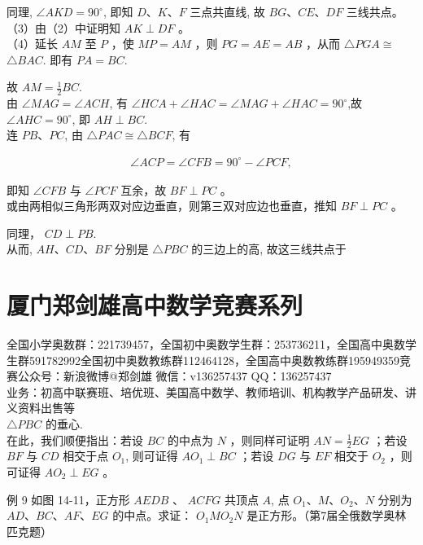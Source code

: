 \documentclass[10pt]{article}
\begin{document}
同理, $\angle A K D=90^{\circ}$, 即知 $D 、 K 、 F$ 三点共直线, 故 $B G 、 C E 、 D F$ 三线共点。\\
（3）由（2）中证明知 $A K \perp D F$ 。\\
（4）延长 $A M$ 至 $P$ ，使 $M P=A M$ ，则 $P G=A E=A B$ ，从而 $\triangle P G A \cong$ $\triangle B A C$. 即有 $P A=B C$.

故 $A M=\frac{1}{2} B C$.\\
由 $\angle M A G=\angle A C H$, 有 $\angle H C A+\angle H A C=\angle M A G+\angle H A C=90^{\circ}$,故 $\angle A H C=90^{\circ}$, 即 $A H \perp B C$.\\
连 $P B 、 P C$, 由 $\triangle P A C \cong \triangle B C F$, 有

\begin{align*}
\angle A C P=\angle C F B=90^{\circ}-\angle P C F,
\end{align*}

即知 $\angle C F B$ 与 $\angle P C F$ 互余，故 $B F \perp P C$ 。\\
或由两相似三角形两双对应边垂直，则第三双对应边也垂直，推知 $B F \perp P C$ 。

同理， $C D \perp P B$.\\
从而, $A H 、 C D 、 B F$ 分别是 $\triangle P B C$ 的三边上的高, 故这三线共点于

\section*{厦门郑剑雄高中数学竞赛系列}
全国小学奥数群：221739457，全国初中奥数学生群：253736211，全国高中奥数学生群591782992全国初中奥数教练群112464128，全国高中奥数教练群195949359竞赛公众号：新浪微博@郑剑雄 微信：v136257437 QQ：136257437\\
业务：初高中联赛班、培优班、美国高中数学、教师培训、机构教学产品研发、讲义资料出售等\\
$\triangle P B C$ 的垂心.\\
在此，我们顺便指出：若设 $B C$ 的中点为 $N$ ，则同样可证明 $A N=\frac{1}{2} E G$ ；若设 $B F$ 与 $C D$ 相交于点 $O_{1}$, 则可证得 $A O_{1} \perp B C$ ；若设 $D G$ 与 $E F$ 相交于 $O_{2}$ ，则可证得 $A O_{2} \perp E G$ 。

例 9 如图 14-11，正方形 $A E D B$ 、 $A C F G$ 共顶点 $A$, 点 $O_{1} 、 M 、 O_{2} 、 N$ 分别为 $A D 、 B C 、 A F 、 E G$ 的中点。求证： $O_{1} M O_{2} N$ 是正方形。（第7届全俄数学奥林匹克题）
\end{document}
